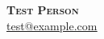 \documentclass[letterpaper,11pt]{article}
\begin{document}
\begin{center}
  \textbf{\Huge \scshape Test Person} \\ \vspace{1pt}
  \small \href{mailto:test@example.com}{\underline{test@example.com}}
\end{center}
\end{document}
